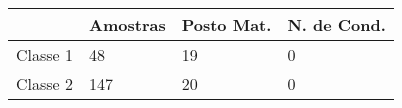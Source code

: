 \begin{tabular}{llll}
& Amostras & Posto Mat. & N. de Cond. \\ 
\hline 
Classe 1 & 48 & 19 & 0 \\ 
Classe 2 & 147 & 20 & 0 \\ 
\hline 
\end{tabular}